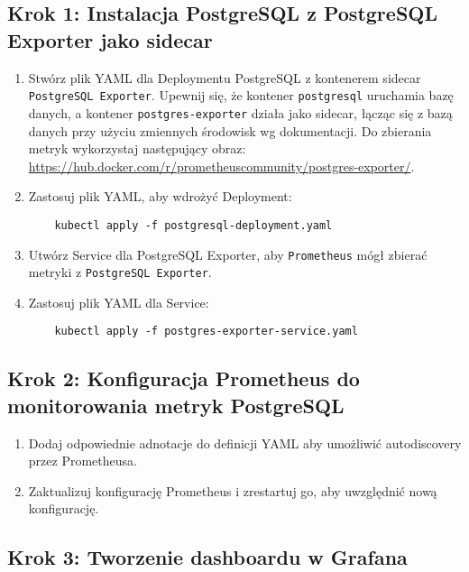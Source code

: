 \documentclass{article}
\begin{document}
\subsection{Krok 1: Instalacja PostgreSQL z PostgreSQL Exporter jako sidecar}

\begin{enumerate}
    \item Stwórz plik YAML dla Deploymentu PostgreSQL z kontenerem sidecar \texttt{PostgreSQL Exporter}. Upewnij się, że kontener \texttt{postgresql} uruchamia bazę danych, a kontener \texttt{postgres-exporter} działa jako sidecar, łącząc się z bazą danych przy użyciu zmiennych środowisk wg dokumentacji. Do zbierania metryk wykorzystaj następujący obraz:\\
      \url{https://hub.docker.com/r/prometheuscommunity/postgres-exporter/}.
    \item Zastosuj plik YAML, aby wdrożyć Deployment:
    \begin{lstlisting}
    kubectl apply -f postgresql-deployment.yaml
    \end{lstlisting}

    \item Utwórz Service dla PostgreSQL Exporter, aby \texttt{Prometheus} mógł zbierać metryki z \texttt{PostgreSQL Exporter}.
    
    \item Zastosuj plik YAML dla Service:
    \begin{lstlisting}
    kubectl apply -f postgres-exporter-service.yaml
    \end{lstlisting}
\end{enumerate}

\subsection{Krok 2: Konfiguracja Prometheus do monitorowania metryk PostgreSQL}

\begin{enumerate}
  \item Dodaj odpowiednie adnotacje do definicji YAML aby umożliwić autodiscovery przez Prometheusa.
  \item Zaktualizuj konfigurację Prometheus i zrestartuj go, aby uwzględnić nową konfigurację.
\end{enumerate}

\subsection{Krok 3: Tworzenie dashboardu w Grafana}
\end{document}
